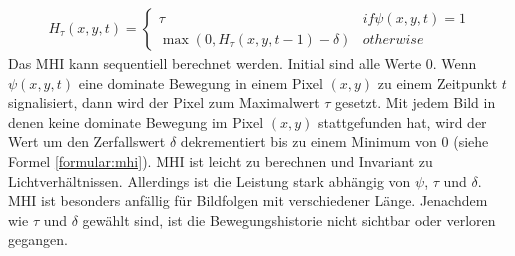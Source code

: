\begin{align}
    H_{\tau}(x,y,t) = \begin{cases}
                          \tau & if \psi(x,y,t) = 1 \\
                          \max(0, H_{\tau}(x,y,t-1) - \delta) & otherwise
    \end{cases}
    \label{formular:mhi}
\end{align}
Das MHI kann sequentiell berechnet werden. Initial sind alle Werte 0. Wenn $\psi(x,y,t)$ eine dominate Bewegung in einem Pixel $(x,y)$ zu einem Zeitpunkt $t$ signalisiert, dann wird der Pixel zum Maximalwert $\tau$
gesetzt. Mit jedem Bild in denen keine dominate Bewegung im Pixel $(x,y)$ stattgefunden hat, wird der Wert um den Zerfallswert $\delta$ dekrementiert bis zu einem Minimum von 0 (siehe Formel \ref{formular:mhi}).
\newline
\newline
MHI ist leicht zu berechnen und Invariant zu Lichtverhältnissen. Allerdings ist die Leistung stark abhängig von $\psi$, $\tau$ und $\delta$. MHI ist besonders anfällig für Bildfolgen mit verschiedener Länge.
Jenachdem wie $\tau$ und $\delta$ gewählt sind, ist die Bewegungshistorie nicht sichtbar oder verloren gegangen.